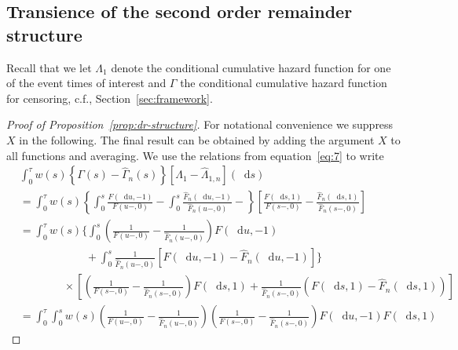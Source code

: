 \documentclass[11pt]{article}
\theoremstyle{thmstyleone}%
\theoremstyle{thmstyletwo}%
\theoremstyle{thmstylethree}%
\newcommand*\diff{\mathop{}\!\mathrm{d}}
\newcommand{\1}{\mathds{1}}
\begin{document}
\subsection{Transience of the second order remainder structure}
\label{sec:state-learner-with}

Recall that we let $\Lambda_1$ denote the conditional cumulative hazard function
for one of the event times of interest and $\Gamma$ the conditional cumulative
hazard function for censoring, c.f., Section~\ref{sec:framework}.

\begin{proof}[Proof of Proposition~\ref{prop:dr-structure}]
  For notational convenience we suppress \( X \) in the following. The final
  result can be obtained by adding the argument \( X \) to all functions and
  averaging. We use the relations from equation~\eqref{eq:7} to write
  \begingroup %
  \allowdisplaybreaks
    \begin{align*}
      & \int_0^{\tau} w(s) 
        \left\{
        \Gamma(s) - \hat{\Gamma}_n(s)
        \right\}
        [\Lambda_1 - \hat{\Lambda}_{1,n}](\diff s)
      \\
      & =
        \int_0^{\tau} w(s) 
        \left\{
        \int_0^s \frac{F(\diff u, -1)}{F(u-, 0)} -
        \int_0^s \frac{\hat{F}_n(\diff u, -1)}{\hat{F}_n(u-, 0)}  -
        \right\}
        \left[
        \frac{F(\diff s, 1)}{F(s-, 0)}
        - \frac{\hat{F}_n(\diff s, 1)}{\hat{F}_n(s-, 0)}
        \right]
      \\
      & =
        \int_0^{\tau} w(s) 
        \Bigg\{
        \int_0^s 
        \left(
        \frac{1}{F(u-, 0)} -  \frac{1}{\hat{F}_n(u-, 0)}
        \right) F(\diff u, -1)
      \\
      & \qquad\qquad \qquad
        +
        \int_0^s \frac{1}{\hat{F}_n(u-, 0)} 
        \left[
        F(\diff u, -1) - \hat{F}_n(\diff u, -1)
        \right]
        \Bigg\}
      \\
      & \qquad\qquad \times
        \left[
        \left(
        \frac{1}{F(s-, 0)} -
        \frac{1}{\hat{F}_n(s-, 0)}
        \right)F(\diff s, 1)
        + \frac{1}{\hat{F}_n(s-, 0)}
        \left(
        F(\diff s, 1) -
        \hat{F}_n(\diff s, 1)
        \right)
        \right]
      \\
      &
        = \int_0^{\tau} 
        \int_0^s
        w(s) 
        \left(
        \frac{1}{F(u-, 0)} -  \frac{1}{\hat{F}_n(u-, 0)}
        \right) 
        \left(
        \frac{1}{F(s-, 0)} -
        \frac{1}{\hat{F}_n(s-, 0)}
        \right)F(\diff u, -1)F(\diff s, 1)

\end{align*}
\end{proof}
\end{document}
